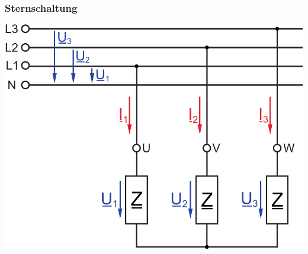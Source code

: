 \documentclass[a4paper,twocolumn,10pt]{article}
\begin{document}
\subsubsection{Sternschaltung}
\begin{center}
\includegraphics[width=0.8\columnwidth]{Grafiken/Sternschaltung}
\end{center}
\end{document}
